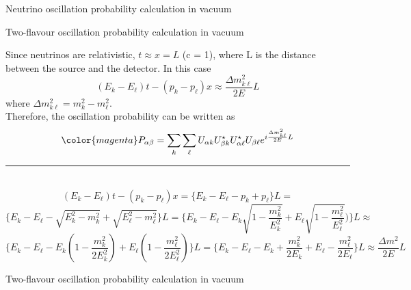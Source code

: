 {\begin{frame}{Neutrino oscillation probability calculation in vacuum}
\end{frame}

%
%
%

\begin{frame}{Two-flavour oscillation probability calculation in vacuum}

  Since neutrinos are relativistic, $t \approx x = L$ (c = 1),
  where L is the distance between the source and the detector.
  In this case
  \begin{equation*}
    (E_{k}-E_{\ell})t-(p_{k}-p_{\ell})x \approx \frac{\Delta m^{2}_{k \ell}}{2E}L
  \end{equation*}
  where $\Delta m^{2}_{k \ell} = m^{2}_{k}-m^{2}_{\ell}$.\\
  \vspace{0.3cm}
  Therefore, the oscillation probability can be written as
  \begin{equation*}
  {\color{magenta}
   P_{\alpha \beta} =
      \sum_{k} \sum_{\ell}
      U_{{\alpha}k} U^{\star}_{{\beta}k}
      U^{\star}_{{\alpha}\ell} U_{{\beta}\ell}
      e^{i \frac{\Delta m^{2}_{k \ell}}{2E}L}
  }
  \end{equation*}

  \noindent\rule{2cm}{0.4pt}\\
  {
  \scriptsize
  \begin{equation*}
    (E_{k}-E_{\ell})t-(p_{k}-p_{\ell})x =
    \Big\{E_{k}-E_{\ell}-p_{k}+p_{\ell}\Big\}L =
  \end{equation*}
  \begin{equation*}
    \Big\{E_{k}-E_{\ell}-\sqrt{E^{2}_{k}-m^{2}_{k}}+\sqrt{E^{2}_{\ell}-m^{2}_{\ell}}\Big\}L =
    \Big\{E_{k}-E_{\ell}-
         E_{k}    \sqrt{1-\frac{m^{2}_{k}}   {E^{2}_{k}}} +
         E_{\ell} \sqrt{1-\frac{m^{2}_{\ell}}{E^{2}_{\ell}}})\Big\}L \approx
  \end{equation*}
  \begin{equation*}
    \Big\{E_{k}-E_{\ell}-
         E_{k}    (1-\frac{m^{2}_{k}}   {2E^{2}_{k}})+
         E_{\ell} (1-\frac{m^{2}_{\ell}}{2E^{2}_{\ell}}) \Big\}L =
    \Big\{E_{k} - E_{\ell} -
          E_{k}    + \frac{m^{2}_{k}}   {2E_{k}} +
          E_{\ell} - \frac{m^{2}_{\ell}}{2E_{\ell}} \Big\}L \approx \frac{\Delta m^{2}}{2E}L
  \end{equation*}
  }

\end{frame}


%
%
%

\begin{frame}{Two-flavour oscillation probability calculation in vacuum}


\end{frame}}
